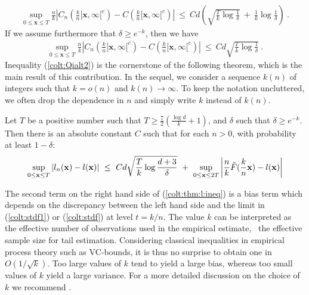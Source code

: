 \begin{align*}
\sup_{0 \le \mathbf{x} \le T} \frac{n}{k} \left | C_n(\frac{k}{n} [\mathbf{x},\infty[^c) - C(\frac{k}{n} [\mathbf{x},\infty[^c)  \right| ~\le~ C d\left(\sqrt{\frac{T}{k} \log{\frac{1}{\delta}}} ~+~ \frac{1}{k} \log \frac{1}{\delta} \right)~.
\end{align*}
If we assume furthermore that $\delta \ge e^{-k}$, then we have 
\begin{align}
\label{colt:Qialt2}
\sup_{0 \le \mathbf{x} \le T} \frac{n}{k} \left | C_n(\frac{k}{n} [\mathbf{x},\infty[^c) - C(\frac{k}{n} [\mathbf{x},\infty[^c)  \right| ~\le~ C d\sqrt{\frac{T}{k} \log{\frac{1}{\delta}}}~.
\end{align}
\noindent
Inequality (\ref{colt:Qialt2}) is the cornerstone of the following theorem, which is the main result of this contribution.
In the sequel, we consider a sequence $k(n)$ of integers such that $k=
o(n)$ and $k(n) \to \infty$. To keep the notation uncluttered, we often 
drop the dependence in $n$ and simply write $k$ instead of $k(n)$. 
\begin{theorem}
\label{colt:thm:l}
Let $T$ be a positive number such that $T \ge \frac{7}{2}(\frac{\log d}{k} + 1)$, and $\delta$ such that $\delta \ge e^{-k}$. Then there is an absolute constant $C$ such that for each $n >0$, with probability at least $1-\delta$:
\begin{align}
\label{colt:thm:l:ineq}
\sup_{0 \le \mathbf{x} \le T} \left| l_n(\mathbf{x}) - l(\mathbf{x})
\right| ~\le~ Cd\sqrt{\frac{T}{k}\log\frac{d+3}{\delta}} ~+~ \sup_{0
  \le \mathbf{x} \le 2T}\left|\frac{n}{k} \tilde
  F(\frac{k}{n}\mathbf{x})- %
l(\mb x)\right|
\end{align}
\end{theorem}
The second term on the right hand side of (\ref{colt:thm:l:ineq}) is
a  bias term which depends on 
the  discrepancy between the left hand side and the limit in
  (\ref{colt:stdf1}) or (\ref{colt:stdf}) at level $t=k/n$. 
The value $k$ can be interpreted as the effective number of observations  used in the empirical estimate, \ie~the effective sample size for tail estimation. 
Considering classical inequalities in empirical process theory such as
VC-bounds, it is thus no surprise to obtain one  in $O(1/\sqrt k)$.
Too large values of $k$ tend to yield a large bias, whereas too small values of $k$ yield a large variance. For a more detailed discussion on the choice of $k$ we recommend \cite{ELL2009}. 


